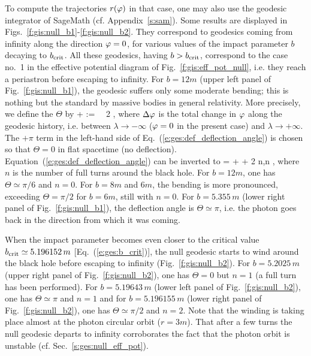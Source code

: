 To compute the trajectories $r(\varphi)$ in that case, one may also use the geodesic integrator
of \textsf{SageMath} (cf. Appendix~\ref{s:sam}). Some results are displayed in
Figs.~\ref{f:gis:null_b1}-\ref{f:gis:null_b2}. They correspond to
geodesics coming from infinity along the
direction $\varphi=0$, for various values of the
impact parameter $b$ decaying to $b_{\rm crit}$. All these geodesics, having
$b > b_{\rm crit}$, correspond to the case no.~1 in the effective potential
diagram of Fig.~\ref{f:gis:eff_pot_null}, i.e. they reach a periastron
before escaping to infinity. For $b=12 m$ (upper left panel of Fig.~\ref{f:gis:null_b1}),
the geodesic suffers only some moderate bending; this is nothing but the standard
 by massive bodies in
general relativity. More precisely, we define the 
$\Theta$ by
\be \label{e:ges:def_deflection_angle}
    \Theta + \pi := \Delta\ph \ \ 2 \pi,
\ee
where $\Delta\varphi$ is the total change in $\varphi$ along the geodesic history, i.e.
between $\lambda\to -\infty$ ($\varphi=0$ in the present case) and $\lambda\to +\infty$.
The $+\pi$ term in the left-hand side of Eq.~(\ref{e:ges:def_deflection_angle}) is chosen so
that $\Theta = 0$ in flat spacetime (no deflection).
Equation~(\ref{e:ges:def_deflection_angle}) can be
inverted to
\be \label{e:ges:Dph_Theta_n}
    \Delta\ph = \Theta + \pi + 2 \pi n,\qquad n\in {} ,
\ee
where $n$ is the number of full turns around the black hole.
For $b = 12 m$, one has $\Theta\simeq \pi/6$ and $n=0$.
For $b=8 m$ and $6 m$, the bending is more pronounced,
exceeding $\Theta = \pi/2$ for $b=6 m$, still with $n=0$. For $b=5.355\, m$ (lower right panel of Fig.~\ref{f:gis:null_b1}), the deflection angle is $\Theta\simeq\pi$, i.e. the photon goes back in the direction
from which it was coming.

When the impact parameter becomes even closer to the critical value
$b_{\rm crit}\simeq 5.196152\, m$ [Eq.~(\ref{e:ges:b_crit})],
the null geodesic starts to wind around the black hole before escaping
to infinity (Fig.~\ref{f:gis:null_b2}).
For $b=5.2025\, m$ (upper right panel of Fig.~\ref{f:gis:null_b2}), one has $\Theta=0$
but $n=1$ (a full turn has been performed). For $b=5.19643\, m$ (lower left panel
of Fig.~\ref{f:gis:null_b2}), one has
$\Theta\simeq\pi$ and $n=1$ and for $b=5.196155\, m$ (lower right panel of Fig.~\ref{f:gis:null_b2}), one has
$\Theta\simeq \pi/2$ and $n=2$.
Note that the winding is taking place
almost at the photon circular orbit ($r=3m$). That after a few turns the null geodesic
departs to infinity corroborates the fact that the photon orbit is unstable
(cf. Sec.~\ref{s:ges:null_eff_pot}).

